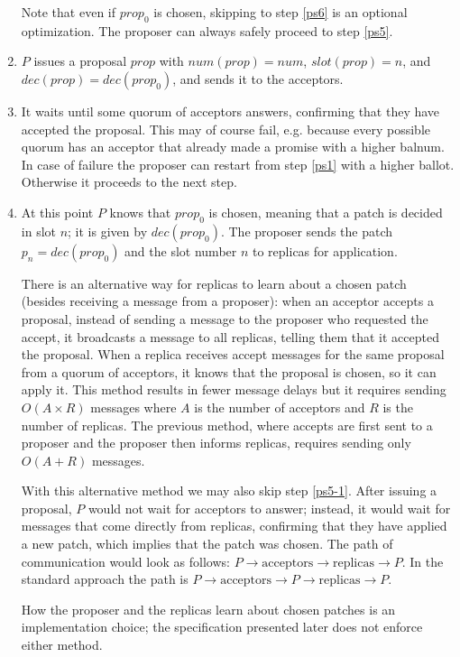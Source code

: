 \documentclass[12pt,a4paper,en]{pracamgr}
\begin{document}
\begin{enumerate}
        Note that even if $prop_0$ is chosen, skipping to step \ref{ps6} is an optional optimization. The proposer can always safely proceed to step \ref{ps5}.
    \item \label{ps5} $P$ issues a proposal $prop$ with $num(prop) = num$, $slot(prop) = n$, and $dec(prop) = dec(prop_0)$, and sends it to the acceptors.

    \item \label{ps5-1} It waits until some quorum of acceptors answers, confirming that they have accepted the proposal. This may of course fail, e.g. because every possible quorum has an acceptor that already made a promise with a higher balnum. In case of failure the proposer can restart from step \ref{ps1} with a higher ballot. Otherwise it proceeds to the next step.
    \item \label{ps6} At this point $P$ knows that $prop_0$ is chosen, meaning that a patch is decided in slot $n$; it is given by $dec(prop_0)$. The proposer sends the patch $p_n = dec(prop_0)$ and the slot number $n$ to replicas for application.

        There is an alternative way for replicas to learn about a chosen patch (besides receiving a message from a proposer): when an acceptor accepts a proposal, instead of sending a message to the proposer who requested the accept, it broadcasts a message to all replicas, telling them that it accepted the proposal. When a replica receives accept messages for the same proposal from a quorum of acceptors, it knows that the proposal is chosen, so it can apply it. This method results in fewer message delays but it requires sending $O(A \times R)$ messages where $A$ is the number of acceptors and $R$ is the number of replicas. The previous method, where accepts are first sent to a proposer and the proposer then informs replicas, requires sending only $O(A + R)$ messages.

        With this alternative method we may also skip step \ref{ps5-1}. After issuing a proposal, $P$ would not wait for acceptors to answer; instead, it would wait for messages that come directly from replicas, confirming that they have applied a new patch, which implies that the patch was chosen. The path of communication would look as follows: $P \rightarrow \text{acceptors} \rightarrow \text{replicas} \rightarrow P$. In the standard approach the path is $P \rightarrow \text{acceptors} \rightarrow P \rightarrow \text{replicas} \rightarrow P$.

        How the proposer and the replicas learn about chosen patches is an implementation choice; the specification presented later does not enforce either method.


\end{enumerate}
\end{document}
